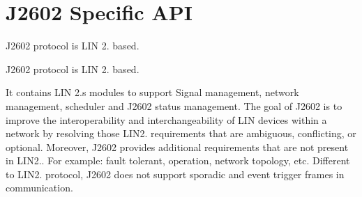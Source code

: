 \hypertarget{group___j2602__core__api__group}{}\section{J2602 Specific A\+P\+I}
\label{group___j2602__core__api__group}


J2602 protocol is L\+I\+N 2. based.  


J2602 protocol is L\+I\+N 2. based. 

It contains L\+I\+N 2.\textquotesingle{}s modules to support Signal management, network management, scheduler and J2602 status management. The goal of J2602 is to improve the interoperability and interchangeability of L\+I\+N devices within a network by resolving those L\+I\+N2. requirements that are ambiguous, conflicting, or optional. Moreover, J2602 provides additional requirements that are not present in L\+I\+N2.. For example\+: fault tolerant, operation, network topology, etc. Different to L\+I\+N2. protocol, J2602 does not support sporadic and event trigger frames in communication. 